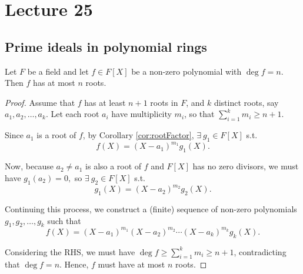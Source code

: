 \section{Lecture 25}
\subsection{Prime ideals in polynomial rings}
\begin{theorem}
  Let $F$ be a field and let $f\in F[X]$ be a non-zero polynomial with $\deg f = n$. Then
  $f$ has at most $n$ roots.
  \label{<+label+>}
\end{theorem}
\begin{proof}
  Assume that $f$ has at least $n+1$ roots in $F$, and $k$ distinct roots, say $a_1, a_2, \ldots, a_{k}$. Let each root $a_i$ have multiplicity $m_i$, so that $\sum_{i=1}^k m_i \geq n+1$. 

Since $a_1$ is a root of $f$, by Corollary \ref{cor:rootFactor}, $\exists \: g_1 \in F[X]$ s.t.
$$ f(X) = (X - a_1)^{m_1}g_1(X). $$

Now, because $a_2 \neq a_1$ is also a root of $f$ and $F[X]$ has no zero divisors, we must have $g_1(a_2) = 0,$ so $\exists \: g_2 \in F[X]$ s.t.
$$ g_1(X) = (X - a_2)^{m_2}g_2(X). $$

Continuing this process, we construct a (finite) sequence of non-zero polynomials $g_1, g_2, \ldots, g_k$ such that
$$ f(X) = (X - a_1)^{m_1}(X - a_2)^{m_2}\cdots(X - a_k)^{m_k}g_k(X). $$






Considering the RHS, we must have $\deg f \geq \sum_{i=1}^k m_i \geq n+1$, contradicting that $\deg f = n$. Hence, $f$ must have at most $n$ roots.
\end{proof}


